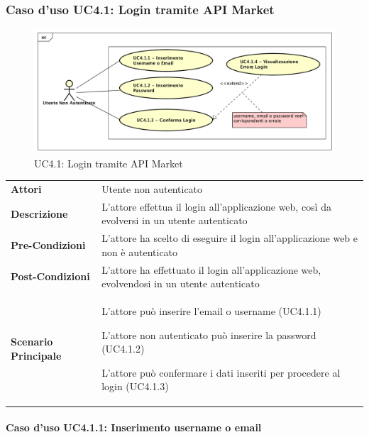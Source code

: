 \newpage
\subsubsection{Caso d'uso UC4.1: Login tramite API Market}
\label{UC4_1}
\begin{figure}[!htbp]
	\centering
	\includegraphics[scale=0.45]{UML/UC4_1.png}
	\caption{UC4.1: Login tramite API Market}
\end{figure}

\begin{tabular}{ l | p{11cm}}
	\hline
	\rowcolor{Gray}
	 \multicolumn{2}{c}{UC4.1 - Login tramite API Market} \\
	 \hline
	\textbf{Attori} & Utente non autenticato \\
	\textbf{Descrizione} & L'attore effettua il login all'applicazione web, così da evolversi in un utente autenticato\\
	\textbf{Pre-Condizioni} & L'attore ha scelto di eseguire il login all'applicazione web e non è autenticato \\
	\textbf{Post-Condizioni} & L'attore ha effettuato il login all'applicazione web, evolvendosi in un utente autenticato \\
	\textbf{Scenario Principale} & 
	\begin{enumerate*}[label=(\arabic*.),itemjoin={\newline}]
		\item L'attore può inserire l'email o username (UC4.1.1)
		\item L'attore non autenticato può inserire la password (UC4.1.2)
		\item L'attore può confermare i dati inseriti per procedere al login (UC4.1.3)
	\end{enumerate*}\\
\end{tabular}

\paragraph{Caso d'uso UC4.1.1:  Inserimento username o email}
\label{UC4_1_1}

